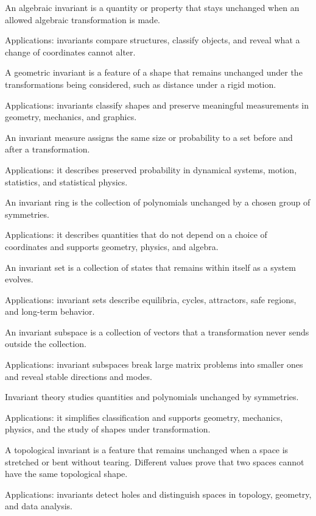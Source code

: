 An algebraic invariant is a quantity or property that stays unchanged when an allowed algebraic transformation is made. \par\noindent Applications: invariants compare structures, classify objects, and reveal what a change of coordinates cannot alter.

A geometric invariant is a feature of a shape that remains unchanged under the transformations being considered, such as distance under a rigid motion. \par\noindent Applications: invariants classify shapes and preserve meaningful measurements in geometry, mechanics, and graphics.

An invariant measure assigns the same size or probability to a set before and after a transformation. \par\noindent Applications: it describes preserved probability in dynamical systems, motion, statistics, and statistical physics.

An invariant ring is the collection of polynomials unchanged by a chosen group of symmetries. \par\noindent Applications: it describes quantities that do not depend on a choice of coordinates and supports geometry, physics, and algebra.

An invariant set is a collection of states that remains within itself as a system evolves. \par\noindent Applications: invariant sets describe equilibria, cycles, attractors, safe regions, and long-term behavior.

An invariant subspace is a collection of vectors that a transformation never sends outside the collection. \par\noindent Applications: invariant subspaces break large matrix problems into smaller ones and reveal stable directions and modes.

Invariant theory studies quantities and polynomials unchanged by symmetries. \par\noindent Applications: it simplifies classification and supports geometry, mechanics, physics, and the study of shapes under transformation.

A topological invariant is a feature that remains unchanged when a space is stretched or bent without tearing. Different values prove that two spaces cannot have the same topological shape. \par\noindent Applications: invariants detect holes and distinguish spaces in topology, geometry, and data analysis.

